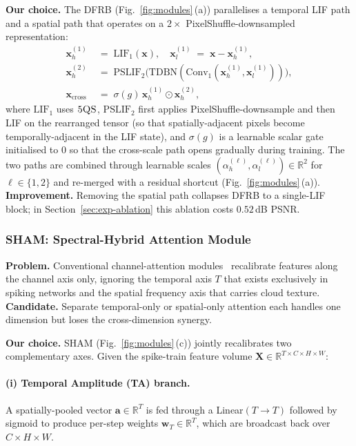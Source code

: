 \documentclass[conference]{IEEEtran}
\newcommand{\R}{\mathbb{R}}
\newcommand{\DFRB}{\textsc{DFRB}}
\newcommand{\SHAM}{\textsc{SHAM}}
\newcommand{\FQS}{\textsc{5QS}}
\begin{document}
\textbf{Our choice.}\;\;
The \DFRB{} (Fig.~\ref{fig:modules}\,(a)) parallelises a temporal
LIF path and a spatial path that operates on a $2\!\times\!$
PixelShuffle-downsampled representation:
\begin{align}
\mathbf{x}_h^{(1)} &\;=\; \mathrm{LIF}_1(\mathbf{x}),\quad
\mathbf{x}_l^{(1)} \;=\; \mathbf{x}-\mathbf{x}_h^{(1)}, \\
\mathbf{x}_h^{(2)} &\;=\; \mathrm{PSLIF}_2\!\big(\mathrm{TDBN}(\mathrm{Conv}_1(\mathbf{x}_h^{(1)},\mathbf{x}_l^{(1)}))\big),\\
\mathbf{x}_{\mathrm{cross}} &\;=\; \sigma(g)\,\mathbf{x}_h^{(1)}\!\odot\!\mathbf{x}_h^{(2)},
\label{eq:dfrb-cross}
\end{align}
where $\mathrm{LIF}_1$ uses $\FQS{}$, $\mathrm{PSLIF}_2$ first applies
PixelShuffle-downsample and then LIF on the rearranged tensor (so
that spatially-adjacent pixels become temporally-adjacent in the
LIF state), and $\sigma(g)$ is a learnable scalar gate initialised
to $0$ so that the cross-scale path opens gradually during training.
The two paths are combined through learnable scales
$(\alpha_h^{(\ell)},\alpha_l^{(\ell)})\!\in\!\R^2$ for $\ell\!\in\!\{1,2\}$
and re-merged with a residual shortcut (Fig.~\ref{fig:modules}\,(a)).
\textbf{Improvement.}\;\;
Removing the spatial path collapses \DFRB{} to a single-LIF block;
in Section~\ref{sec:exp-ablation} this ablation costs $0.52$\,dB
PSNR.

\subsubsection{\SHAM{}: Spectral-Hybrid Attention Module}\label{sec:framework-sham}

\textbf{Problem.}\;\;
Conventional channel-attention modules~\cite{ref:cbam} recalibrate
features along the channel axis only, ignoring the temporal axis
$T$ that exists exclusively in spiking networks and the spatial
frequency axis that carries cloud texture. \textbf{Candidate.}\;\;
Separate temporal-only or spatial-only attention each handles one
dimension but loses the cross-dimension synergy.

\textbf{Our choice.}\;\;
\SHAM{} (Fig.~\ref{fig:modules}\,(c)) jointly recalibrates two
complementary axes. Given the spike-train feature volume
$\mathbf{X}\!\in\!\R^{T\times C\times H\times W}$:
\paragraph{(i) Temporal Amplitude (TA) branch.}
A spatially-pooled vector
$\mathbf{a}\!\in\!\R^T$ is fed through a Linear$(T\!\to\!T)$
followed by sigmoid to produce per-step weights
$\mathbf{w}_T\!\in\!\R^T$, which are broadcast back over $C\!\times\!H\!\times\!W$.
\end{document}
